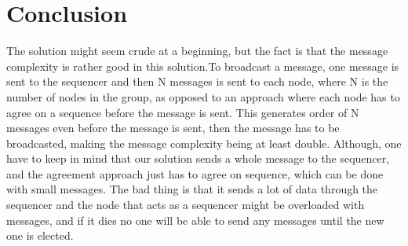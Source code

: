 \documentclass{article}
\begin{document}
\section{Conclusion}
  The solution might seem crude at a beginning, but the fact is that the message complexity
  is rather good in this solution.To broadcast a message, one message is sent to the sequencer and then N 
  messages is sent to each node, where N is the number of nodes in the group, as opposed to an approach
  where each node has to agree on a sequence before the message is sent. This generates order of N messages
  even before the message is sent, then the message has to be broadcasted, making the message complexity
  being at least double. Although, one have to keep in mind that our solution sends a whole message
  to the sequencer, and the agreement approach just has to agree on sequence, which can be done with
  small messages. The bad thing is that it sends a lot of data through the sequencer and the node 
  that acts as a sequencer might be overloaded with messages, and if it dies no one will be able 
  to send any messages until the new one is elected.
\end{document}
